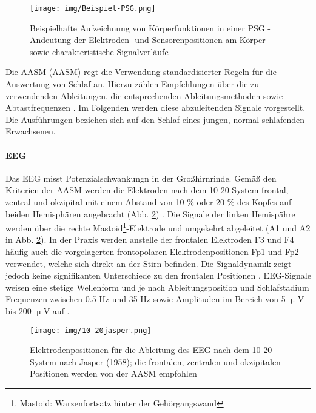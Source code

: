 \begin{figure}[H]
	\centering
	\texttt{[image: img/Beispiel-PSG.png]}
	\caption[Beispielhafte \acs{PSG}]{Beispielhafte Aufzeichnung von Körperfunktionen in einer \acs{PSG} - Andeutung der Elektroden- und Sensorenpositionen am Körper sowie charakteristische Signalverläufe\parencite{penzel_schlafstorungen_2005}}
	\label{fig:beispiel-psg}
\end{figure}

Die \acl{AASM} (\acs{AASM}) regt die Verwendung standardisierter Regeln für die Auswertung von Schlaf an. Hierzu zählen Empfehlungen über die zu verwendenden Ableitungen, die entsprechenden Ableitungsmethoden sowie Abtastfrequenzen \parencite{iber_aasm_2007}. Im Folgenden werden diese abzuleitenden Signale vorgestellt. Die Ausführungen beziehen sich auf den Schlaf eines jungen, normal schlafenden Erwachsenen.\\

\paragraph{\acs{EEG}}
Das \acs{EEG} misst Potenzialschwankungn in der Großhirnrinde. Gemäß den Kriterien der \acs{AASM} werden die Elektroden nach dem 10-20-System frontal, zentral und okzipital mit einem Abstand von 10 \% oder 20 \% des Kopfes auf beiden Hemisphären angebracht (Abb. \ref{fig:10-20jasper}) \parencite{iber_aasm_2007}. Die Signale der linken Hemispähre werden über die rechte Mastoid\footnote{Mastoid: Warzenfortsatz hinter der Gehörgangswand}-Elektrode und umgekehrt abgeleitet (A1 und A2 in Abb. \ref{fig:10-20jasper}). In der Praxis werden anstelle der frontalen Elektroden F3 und F4 häufig auch die vorgelagerten frontopolaren Elektrodenpositionen Fp1 und Fp2 verwendet, welche sich direkt an der Stirn befinden. Die Signaldynamik zeigt jedoch keine signifikanten Unterschiede zu den frontalen Positionen \parencite{dorffner_effects_2015}. \acs{EEG}-Signale weisen eine stetige Wellenform und je nach Ableitungsposition und Schlafstadium Frequenzen zwischen 0.5 Hz und 35 Hz sowie Amplituden im Bereich von 5 $\upmu$V bis 200 $\upmu$V auf \parencite{lee-chiong_sleep_2008}.

\begin{figure}[H]
	\centering
	\texttt{[image: img/10-20jasper.png]}
	\caption[Elektrodenpositionen des \acs{EEG}]{Elektrodenpositionen für die Ableitung des \acs{EEG} nach dem 10-20-System nach Jasper (1958); die frontalen, zentralen und okzipitalen Positionen werden von der \acs{AASM} empfohlen \parencite{kemp_edf+:_????}}
	\label{fig:10-20jasper}
\end{figure}

